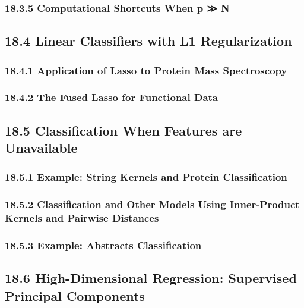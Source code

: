 \documentclass[11pt]{article}
\begin{document}
\subsubsection{18.3.5 Computational Shortcuts When p ≫
N}\label{computational-shortcuts-when-p-n}

\subsection{18.4 Linear Classifiers with L1
Regularization}\label{linear-classifiers-with-l1-regularization}

\subsubsection{18.4.1 Application of Lasso to Protein Mass
Spectroscopy}\label{application-of-lasso-to-protein-mass-spectroscopy}

\subsubsection{18.4.2 The Fused Lasso for Functional
Data}\label{the-fused-lasso-for-functional-data}

\subsection{18.5 Classification When Features are
Unavailable}\label{classification-when-features-are-unavailable}

\subsubsection{18.5.1 Example: String Kernels and Protein
Classification}\label{example-string-kernels-and-protein-classification}

\subsubsection{18.5.2 Classification and Other Models Using
Inner-Product Kernels and Pairwise
Distances}\label{classification-and-other-models-using-inner-product-kernels-and-pairwise-distances}

\subsubsection{18.5.3 Example: Abstracts
Classification}\label{example-abstracts-classification}

\subsection{18.6 High-Dimensional Regression: Supervised Principal
Components}\label{high-dimensional-regression-supervised-principal-components}
\end{document}

